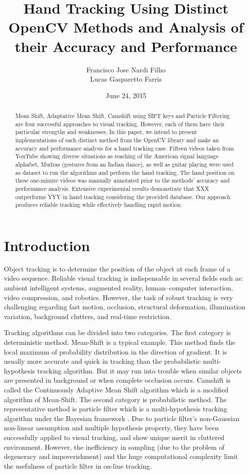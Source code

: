 \documentclass[a4paper]{article}
\title{Hand Tracking Using Distinct OpenCV Methods and Analysis of their Accuracy and Performance}
\author{Francisco Jose Nardi Filho\\ Lucas Gasparetto Farris}
\date{June  24, 2015}
\begin{document}
\maketitle

\begin{abstract}
\noindent
Mean Shift, Adaptative Mean Shift, Camshift using SIFT keys and Particle Filtering are four successful approaches to visual tracking. 
However, each of them have their particular strengths and weaknesses. In this paper, we intend to present implementations of each distinct method from the OpenCV library and make an accuracy and  performance analysis for a hand tracking case. Fifteen videos taken from YouTube showing diverse situations as teaching of the American signal language alphabet, Mudras (gestures from an Indian dance), as well as guitar playing  were used as dataset to run the algorithms and perform the hand tracking. The hand position on these one-minute videos was manually annotated prior to the methods' accuracy and performance analysis. Extensive experimental results demonstrate that XXX outperforms YYY in hand tracking considering the provided database. Our approach produces reliable tracking while effectively handling rapid motion.
\end{abstract}

\section{Introduction}

Object tracking is to determine the position of the object at each frame of a video sequence. Reliable visual tracking is indispensable in several fields such as: ambient intelligent systems, augmented reality, human–computer interaction, video compression, and robotics. However, the task of robust tracking is very challenging regarding fast motion, occlusion, structural deformation, illumination variation, background clutters, and real-time restriction\cite{Yin2011}. 
\par
Tracking algorithms can be divided into two categories. The first category is deterministic method. Mean-Shift  is a typical example. This method finds the local maximum of probability distribution in the direction of gradient. It is usually more accurate and quick in tracking than the probabilistic multi-hypothesis tracking algorithm. But it may run into trouble when similar objects are presented in background or when complete occlusion occurs. Camshift is called the Continuously Adaptive Mean Shift algorithm which is a modified algorithm of Mean-Shift. The second category is probabilistic method. The representative method is particle filter which is a multi-hypothesis tracking algorithm under the Bayesian framework . Due to particle filter’s non-Gaussian non-linear assumption and multiple hypothesis property, they have been successfully applied to visual tracking, and show unique merit in cluttered environment. However, the inefficiency in sampling (due to the problem of degeneracy and impoverishment) and the huge computational complexity limit the usefulness of particle filter in on-line tracking\cite{Yin2011}.
\par




\end{document}
